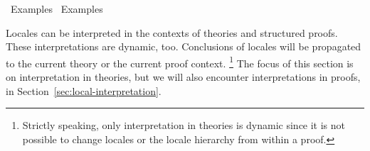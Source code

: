 %
\begin{isabellebody}%
\def\isabellecontext{Examples{\isadigit{1}}}%
%
\isadelimtheory
%
\endisadelimtheory
%
\isatagtheory
{}\isamarkupfalse%
\ Examples{}\isanewline
{}\ Examples\isanewline
{}%
\endisatagtheory
{\isafoldtheory}%
%
\isadelimtheory
%
\endisadelimtheory
%
\begin{isamarkuptext}%
\vspace{-5ex}%
\end{isamarkuptext}%
\isamarkuptrue%
%
\isamarkuptrue%
%
\begin{isamarkuptext}%
Locales can be interpreted in the contexts of theories and
  structured proofs.  These interpretations are dynamic, too.
  Conclusions of locales will be propagated to the current theory or
  the current proof context.%
\footnote{Strictly speaking, only interpretation in theories is
  dynamic since it is not possible to change locales or the locale
  hierarchy from within a proof.}
  The focus of this section is on
  interpretation in theories, but we will also encounter
  interpretations in proofs, in
  Section~\ref{sec:local-interpretation}.


\end{isamarkuptext}
\end{isabellebody}

